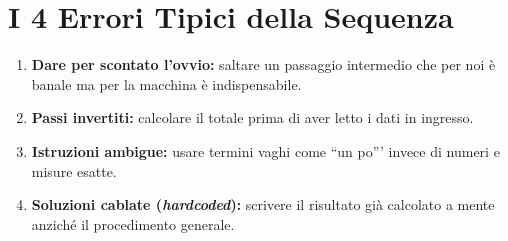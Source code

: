 \section{I 4 Errori Tipici della Sequenza}

\begin{attenzione}
\begin{enumerate}
  \item \textbf{Dare per scontato l'ovvio:} saltare un passaggio intermedio che per noi è banale ma per la macchina è indispensabile.
  \item \textbf{Passi invertiti:} calcolare il totale prima di aver letto i dati in ingresso.
  \item \textbf{Istruzioni ambigue:} usare termini vaghi come ``un po''' invece di numeri e misure esatte.
  \item \textbf{Soluzioni cablate (\emph{hardcoded}):} scrivere il risultato già calcolato a mente anziché il procedimento generale.
\end{enumerate}
\end{attenzione}
